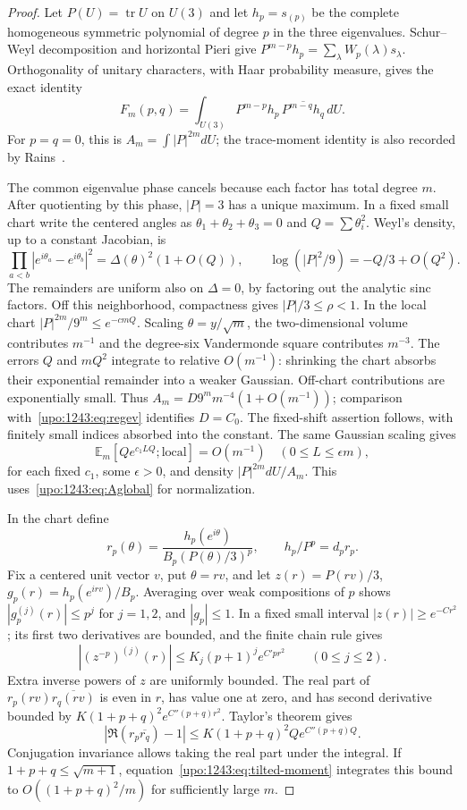 \documentclass[11pt,letterpaper]{article}
\theoremstyle{remark}\newtheorem{remark}[theorem]{Remark}
\numberwithin{equation}{section}
\begin{document}
\begin{proof}
Let $P(U)=\operatorname{tr}U$ on $U(3)$ and let $h_p=s_{(p)}$ be the
complete homogeneous symmetric polynomial of degree $p$ in the three
eigenvalues. Schur--Weyl decomposition and horizontal Pieri give
$P^{m-p}h_p=\sum_\lambda W_p(\lambda)s_\lambda$. Orthogonality of unitary
characters, with Haar probability measure, gives the exact identity
\begin{equation}\label{upo:1243:eq:unitary}
 F_m(p,q)=\int_{U(3)}P^{m-p}h_p\,
                    \overline{P^{m-q}h_q}\,dU.
\end{equation}
For $p=q=0$, this is $A_m=\int|P|^{2m}dU$; the trace-moment identity is
also recorded by Rains~\cite{Rains}.

The common eigenvalue phase cancels because each factor has total degree
$m$. After quotienting by this phase, $|P|=3$ has a unique maximum.
In a fixed small chart write the centered angles as
$\theta_1+\theta_2+\theta_3=0$ and $Q=\sum\theta_i^2$. Weyl's density,
up to a constant Jacobian, is
\[
 \prod_{a<b}|e^{i\theta_a}-e^{i\theta_b}|^2
   =\Delta(\theta)^2(1+O(Q)),\qquad
 \log(|P|^2/9)=-Q/3+O(Q^2).
\]
The remainders are uniform also on $\Delta=0$, by factoring out the
analytic sinc factors. Off this neighborhood, compactness gives
$|P|/3\le\rho<1$. In the local chart $|P|^{2m}/9^m\le e^{-cmQ}$.
Scaling $\theta=y/\sqrt m$, the two-dimensional volume contributes
$m^{-1}$ and the degree-six Vandermonde square contributes $m^{-3}$.
The errors $Q$ and $mQ^2$ integrate to relative $O(m^{-1})$: shrinking the
chart absorbs their exponential remainder into a weaker Gaussian.
Off-chart contributions are exponentially small. Thus
$A_m=D9^m m^{-4}(1+O(m^{-1}))$; comparison with~\eqref{upo:1243:eq:regev}
identifies $D=C_0$. The fixed-shift assertion follows, with finitely small
indices absorbed into the constant. The same Gaussian scaling gives
\begin{equation}\label{upo:1243:eq:tilted-moment}
 \mathbb E_m[Qe^{c_1LQ};\mathrm{local}]=O(m^{-1})
 \quad(0\le L\le\epsilon m),
\end{equation}
for each fixed $c_1$, some $\epsilon>0$, and density
$|P|^{2m}dU/A_m$. This uses~\eqref{upo:1243:eq:Aglobal} for normalization.

In the chart define
\[
 r_p(\theta)=\frac{h_p(e^{i\theta})}{B_p(P(\theta)/3)^p},
 \qquad h_p/P^p=d_pr_p.
\]
Fix a centered unit vector $v$, put $\theta=rv$, and let
$z(r)=P(rv)/3$, $g_p(r)=h_p(e^{irv})/B_p$. Averaging over weak
compositions of $p$ shows $|g_p^{(j)}(r)|\le p^j$ for $j=1,2$, and
$|g_p|\le1$. In a fixed small interval $|z(r)|\ge e^{-C r^2}$;
its first two derivatives are bounded, and the finite chain rule gives
\[
 |(z^{-p})^{(j)}(r)|\le K_j(p+1)^j e^{C'pr^2}
 \qquad(0\le j\le2).
\]
Extra inverse powers of $z$ are uniformly bounded. The real part of
$r_p(rv)\overline{r_q(rv)}$ is even in $r$, has value one at zero,
and has second derivative bounded by
$K(1+p+q)^2e^{C''(p+q)r^2}$. Taylor's theorem gives
\[
 |\Re(r_p\overline{r_q})-1|
 \le K(1+p+q)^2Qe^{C''(p+q)Q}.
\]
Conjugation invariance allows taking the real part under the integral.
If $1+p+q\le\sqrt{m+1}$, equation~\eqref{upo:1243:eq:tilted-moment} integrates
this bound to $O((1+p+q)^2/m)$ for sufficiently large $m$.


\end{proof}
\end{document}
